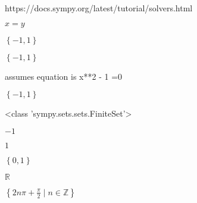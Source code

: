 \documentclass{article}
\begin{document}
https://docs.sympy.org/latest/tutorial/solvers.html
 
\bigskip
$x = y$
 
\bigskip
$\left\{-1, 1\right\}$
 
\bigskip
$\left\{-1, 1\right\}$
 
\bigskip
assumes equation is x**2 - 1 =0
 
\bigskip
$\left\{-1, 1\right\}$
 
\bigskip
<class 'sympy.sets.sets.FiniteSet'>
 
\bigskip
$-1$
 
\bigskip
$1$
 
\bigskip
$\left\{0, 1\right\}$
 
\bigskip
$\mathbb{R}$
 
\bigskip
$\left\{2 n \pi + \frac{\pi}{2}\; |\; n \in \mathbb{Z}\right\}$
 
\bigskip
\end{document}
